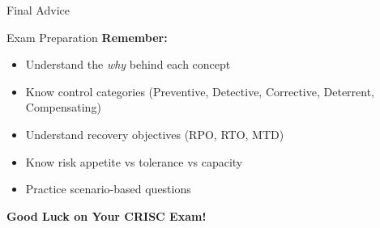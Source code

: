 \documentclass{beamer}
\begin{document}
	\begin{frame}{Final Advice}
		\begin{block}{Exam Preparation}
			\centering
			\vspace{0.3cm}
			\textbf{Remember:}
			\begin{itemize}
				\item Understand the \textit{why} behind each concept
				\item Know control categories (Preventive, Detective, Corrective, Deterrent, Compensating)
				\item Understand recovery objectives (RPO, RTO, MTD)
				\item Know risk appetite vs tolerance vs capacity
				\item Practice scenario-based questions
			\end{itemize}
			\vspace{0.5cm}
			\textbf{Good Luck on Your CRISC Exam!}
		\end{block}
	\end{frame}
	
\end{document}
